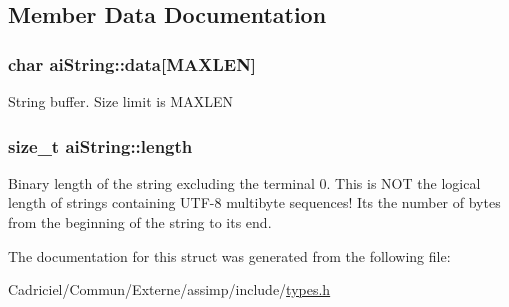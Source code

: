 \subsection{Member Data Documentation}
\subsubsection[{\texorpdfstring{data}{data}}]{\setlength{\rightskip}{0pt plus 5cm}char ai\+String\+::data\mbox{[}{\bf M\+A\+X\+L\+EN}\mbox{]}}\hypertarget{structai_string_aa90b1da7d347a3dcca0a95061e6ea41d}{}\label{structai_string_aa90b1da7d347a3dcca0a95061e6ea41d}
String buffer. Size limit is M\+A\+X\+L\+EN 
\subsubsection[{\texorpdfstring{length}{length}}]{\setlength{\rightskip}{0pt plus 5cm}size\+\_\+t ai\+String\+::length}\hypertarget{structai_string_a7d77c2031ff0340746aa046f7fbcf313}{}\label{structai_string_a7d77c2031ff0340746aa046f7fbcf313}
Binary length of the string excluding the terminal 0. This is N\+OT the logical length of strings containing U\+T\+F-\/8 multibyte sequences! It\textquotesingle{}s the number of bytes from the beginning of the string to its end. 

The documentation for this struct was generated from the following file\+:\begin{DoxyCompactItemize}
\item 
Cadriciel/\+Commun/\+Externe/assimp/include/\hyperlink{types_8h}{types.\+h}\end{DoxyCompactItemize}
